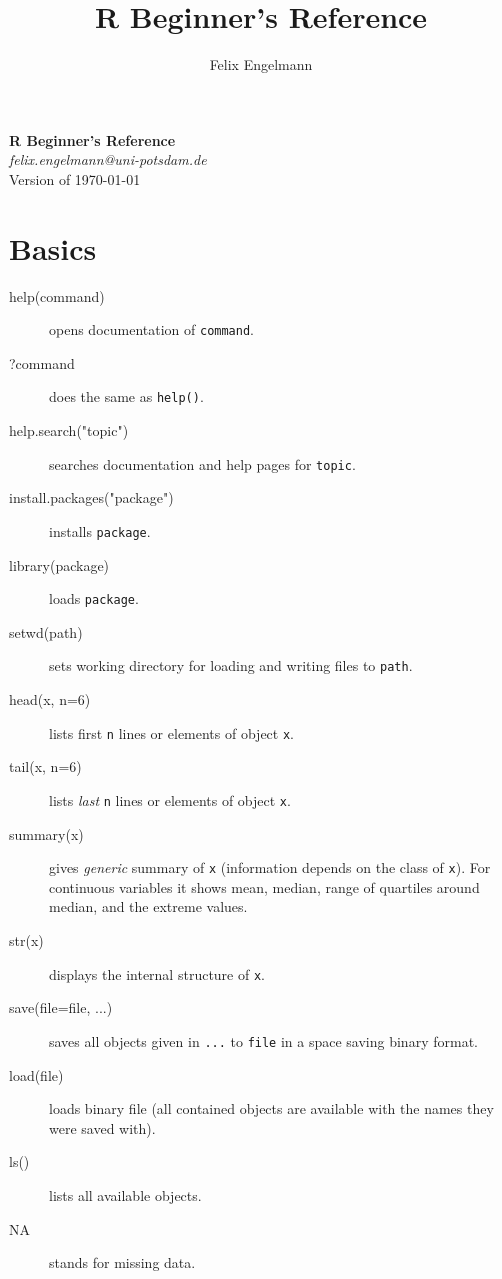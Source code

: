 \documentclass[a4paper,9pt]{extarticle}
\title{R Beginner's Reference}
\author{Felix Engelmann}
\begin{document}
\begin{multicols}{3}
\noindent
{\huge \textbf{R Beginner's Reference}}\\
\emph{felix.engelmann@uni-potsdam.de}\\
Version of \today 


\section{Basics}
\begin{description}
\item[help(command)] opens documentation of \texttt{command}.
\item[?command] does the same as \texttt{help()}.
\item[help.search("topic")] searches documentation and help pages for \texttt{topic}.

\item[install.packages("package")] installs \texttt{package}.
\item[library(package)] loads \texttt{package}.
\item[setwd(path)] sets working directory for loading and writing files to \texttt{path}. 
\item[head(x, n=6)] lists first \texttt{n} lines or elements of object \texttt{x}. 
\item[tail(x, n=6)] lists \textit{last} \texttt{n} lines or elements of object \texttt{x}.
\item[summary(x)] gives \textit{generic} summary of \texttt{x} (information depends on the class of \texttt{x}). For continuous variables it shows mean, median, range of quartiles around median, and the extreme values.
\item[str(x)] displays the internal structure of \texttt{x}.
\item[save(file=file, ...)] saves all objects given in \texttt{...} to \texttt{file} in a space saving binary format.
\item[load(file)] loads binary file (all contained objects are available with the names they were saved with).
\item[ls()] lists all available objects.
\item[NA] stands for missing data.
\end{description}


\end{multicols}
\end{document}
